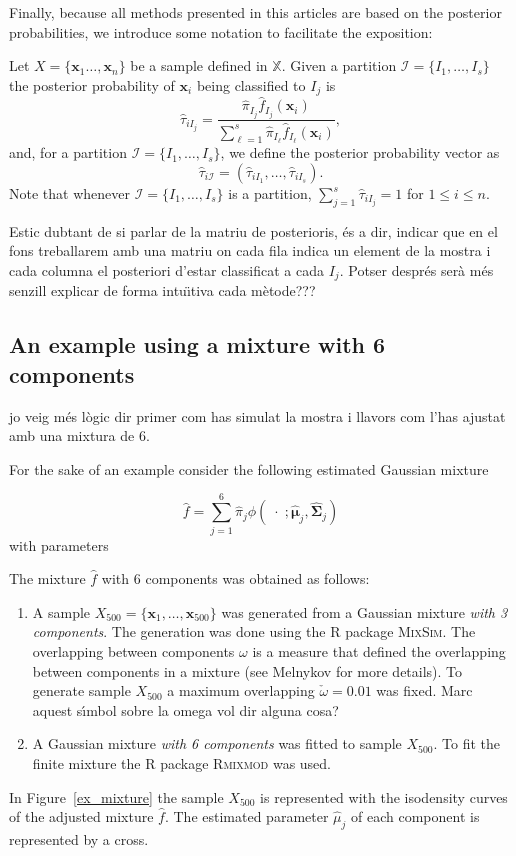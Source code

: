 \documentclass[10pt, a4paper]{article}
\newcommand{\m}[1]{\boldsymbol{#1}}
\begin{document}
Finally, because all methods presented in this articles are based on the posterior probabilities, we introduce some notation to facilitate the exposition:


Let $X = \{\m x_1\dots, \m x_n\}$ be a sample defined in $\mathbb{X}$. Given a partition $\mathcal{I} = \{ I_1, \dots, I_s \}$ the posterior probability  of $\m x_i$ being classified to $I_j$ is
\[
\hat{\tau}_{i I_j} =  \frac{ \hat{\pi}_{I_j} \hat{f}_{I_j}(\m x_i) }{\sum_{\ell=1}^s \hat{\pi}_{I_\ell} \hat{f}_{I_\ell}(\m x_i)},
\]
and, for a partition  $\mathcal{I} = \{ I_1, \dots, I_s\}$, we define the posterior probability vector as
\[
\hat{\tau}_{i \mathcal{I}} = \left( \hat{\tau}_{i I_1} , \dots, \hat{\tau}_{i I_s}  \right).
\]
Note that whenever  $\mathcal{I} = \{ I_1, \dots, I_s\}$ is a partition, $\sum_{j=1}^s \hat{\tau}_{i I_j} = 1$ for $1 \leq i \leq n$.

{\color{blue} Estic dubtant de si parlar de la matriu de posterioris, \'{e}s a dir, indicar que en el fons treballarem amb una matriu on cada fila indica un element de la mostra i cada columna el posteriori d'estar classificat a cada $I_j$. Potser despr\'{e}s ser\`{a} m\'{e}s senzill explicar de forma intu\"{\i}tiva cada m\`{e}tode???}

\subsection*{An example using a mixture with 6 components}
{\color{blue} jo veig m\'{e}s l\`{o}gic dir primer com has simulat la mostra i llavors com l'has ajustat amb una mixtura de 6.}

For the sake of an example consider the following estimated Gaussian mixture

\[
\hat{f} = \sum_{j=1}^6 \hat{\pi}_j \phi(\;\cdot\; ; \hat{\m\mu}_j, \hat{\m\Sigma}_j)
\]
with parameters
{\small

}

The mixture $\hat{f}$ with $6$ components was obtained as follows:
\begin{enumerate}
\item A sample  $X_{500}=\{\m x_1, \dots, \m x_{500}\}$ was generated from a Gaussian mixture \emph{with 3 components}. The generation was done using the R package \textsc{MixSim}. The overlapping between components $\omega$ is a measure that defined the overlapping between components in a mixture (see Melnykov for more details). To generate sample $X_{500}$ a maximum overlapping $\check{\omega} = 0.01$ was fixed. {\color{blue} Marc aquest s\'{\i}mbol sobre la omega vol dir alguna cosa?}
\item A Gaussian mixture \emph{with 6 components} was fitted to sample $X_{500}$. To fit the finite mixture the R package \textsc{Rmixmod} was used.
\end{enumerate}
In Figure~\ref{ex_mixture} the sample $X_{500}$ is represented with the isodensity curves of the adjusted mixture $\hat{f}$. The estimated parameter $\hat{\mu}_j$ of each component is represented by a cross.
\end{document}
